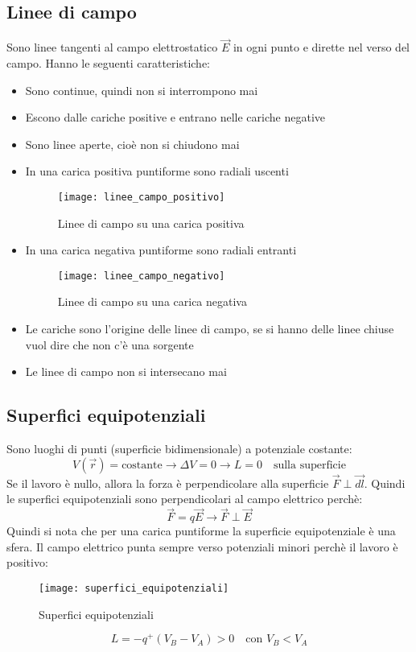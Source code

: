 \documentclass[a4paper]{article}
\begin{document}
\subsection{Linee di campo}
Sono linee tangenti al campo elettrostatico \( \vec{E} \) in ogni punto e dirette
nel verso del campo. Hanno le seguenti caratteristiche:
\begin{itemize}
  \item Sono continue, quindi non si interrompono mai
  \item Escono dalle cariche positive e entrano nelle cariche negative
  \item Sono linee aperte, cioè non si chiudono mai

  \item In una carica positiva puntiforme sono radiali uscenti
    \begin{figure}[H]
      \centering
      \texttt{[image: linee\_campo\_positivo]}
      \caption{Linee di campo su una carica positiva}
    \end{figure}

  \item In una carica negativa puntiforme sono radiali entranti
    \begin{figure}[H]
      \centering
      \texttt{[image: linee\_campo\_negativo]}
      \caption{Linee di campo su una carica negativa}
    \end{figure}

  \item Le cariche sono l'origine delle linee di campo, se si hanno delle linee chiuse
    vuol dire che non c'è una sorgente

  \item Le linee di campo non si intersecano mai
\end{itemize}

\subsection{Superfici equipotenziali}
Sono luoghi di punti (superficie bidimensionale) a potenziale costante:
\[
  V(\vec{r}) = \text{costante} \to \Delta V = 0 \to L = 0 \quad \text{sulla superficie}
\] 
Se il lavoro è nullo, allora la forza è perpendicolare alla superficie \( \vec{F} \perp \vec{dl} \).
Quindi le superfici equipotenziali sono perpendicolari al campo elettrico perchè:
\[
  \vec{F} = q \vec{E} \to \vec{F} \perp \vec{E}
\] 
Quindi si nota che per una carica puntiforme la superficie equipotenziale è una sfera.
Il campo elettrico punta sempre verso potenziali minori perchè il lavoro è positivo:
\begin{figure}[H]
  \centering
  \texttt{[image: superfici\_equipotenziali]}
  \caption{Superfici equipotenziali}
\end{figure}
\[
  L = -q^+ \left( V_B - V_A \right) > 0 \quad \text{con } V_B < V_A
\] 
\end{document}
